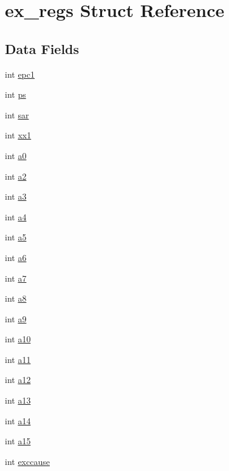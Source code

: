 \hypertarget{structex__regs}{}\section{ex\+\_\+regs Struct Reference}
\label{structex__regs}
\subsection*{Data Fields}
\begin{DoxyCompactItemize}
\item 
int \hyperlink{structex__regs_a907bf7dfc14dd0b4f3c1e35416551590}{epc1}
\item 
int \hyperlink{structex__regs_a41791a7ade763f5f965ca2d412914dbb}{ps}
\item 
int \hyperlink{structex__regs_a8fd11e49ee65ba875a04ab28789cf702}{sar}
\item 
int \hyperlink{structex__regs_a12379b0b3152b878eebc8f18a6efeaf0}{xx1}
\item 
int \hyperlink{structex__regs_ab9e470c41e6c89050e83f07ba3d020a6}{a0}
\item 
int \hyperlink{structex__regs_a26e59e49025e70d6d9aaaf96a3f4df53}{a2}
\item 
int \hyperlink{structex__regs_ab71b2779966288ee152a7b7ca30241f2}{a3}
\item 
int \hyperlink{structex__regs_aa2b0ed69fb75ee2b8384b5b975737c64}{a4}
\item 
int \hyperlink{structex__regs_a8d6ecd5647dd5921c86b70c3db095d15}{a5}
\item 
int \hyperlink{structex__regs_a23fa5fa94f11950e7320393beb830618}{a6}
\item 
int \hyperlink{structex__regs_a73f04b635c3699e9b83fadeacdb1eda2}{a7}
\item 
int \hyperlink{structex__regs_a4a700b056da9b3ea0917603b9c4f9b28}{a8}
\item 
int \hyperlink{structex__regs_a513f72e66ad69090bdbb06fb37f177d1}{a9}
\item 
int \hyperlink{structex__regs_af85ef649abe139889371e7bbecad73ad}{a10}
\item 
int \hyperlink{structex__regs_a94aedd1e40a7f814340b845ba35c6b62}{a11}
\item 
int \hyperlink{structex__regs_a3375d9f2f78cce316b6d6a7ddb4e55c4}{a12}
\item 
int \hyperlink{structex__regs_a6d85cce0da676baba0080cb22ca81ee2}{a13}
\item 
int \hyperlink{structex__regs_aec55873d79a2b12fb9c74e4db8071477}{a14}
\item 
int \hyperlink{structex__regs_ab9f5db40e8ea16e1c55093a7ef374342}{a15}
\item 
int \hyperlink{structex__regs_a001bdc446169cb523be54cf5deeb8dd6}{exccause}
\end{DoxyCompactItemize}


